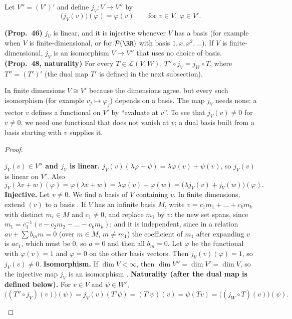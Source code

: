 \documentclass[10pt]{scrartcl}
\newcommand{\PP}{\mathcal P}\newcommand{\LL}{\mathcal L}\newcommand{\MM}{\mathcal M}\newcommand{\T}{\mathsf T}
\begin{document}
\begin{proposition*}
  Let $V''=(V')'$ and define $j_V\colon V\to V''$ by
  \[
    \big(j_V(v)\big)(\varphi) = \varphi(v) \qquad\text{for } v\in V,\ \varphi\in V'.
  \]
  \begin{enumerate}[(a)]
    \ii \textbf{(Prop.~46)} $j_V$ is linear, and it is injective whenever $V$ has a basis (for example when $V$ is finite-dimensional, or for $\PP(\RR)$ with basis $1,x,x^2,\dots$). If $V$ is finite-dimensional, $j_V$ is an isomorphism $V\to V''$ that uses no choice of basis.
    \ii \textbf{(Prop.~48, naturality)} For every $T\in\LL(V,W)$, $T''\circ j_V = j_W\circ T$, where $T''=(T')'$ (the dual map $T'$ is defined in the next subsection).
  \end{enumerate}
\end{proposition*}
\begin{ideabox}
  In finite dimensions $V\cong V'$ because the dimensions agree, but every such isomorphism (for example $v_j\mapsto\varphi_j$) depends on a basis. The map $j_V$ needs none: a vector $v$ defines a functional on $V'$ by ``evaluate at $v$''. To see that $j_V(v)\ne0$ for $v\ne0$, we need one functional that does not vanish at $v$; a dual basis built from a basis starting with $v$ supplies it.
\end{ideabox}
\begin{proof}
  \begin{steps}
    \ii \textbf{$j_V(v)\in V''$ and $j_V$ is linear.} $j_V(v)(\lambda\varphi+\psi)=\lambda\varphi(v)+\psi(v)$, so $j_V(v)$ is linear on $V'$. Also
    \[
      j_V(\lambda v+w)(\varphi)=\varphi(\lambda v+w)=\lambda\varphi(v)+\varphi(w)=\bigl(\lambda j_V(v)+j_V(w)\bigr)(\varphi).
    \]
    \ii \textbf{Injective.} Let $v\ne0$. We find a basis of $V$ containing $v$. In finite dimensions, extend $(v)$ to a basis . If $V$ has an infinite basis $M$, write $v=c_1m_1+\dots+c_km_k$ with distinct $m_i\in M$ and $c_1\ne0$, and replace $m_1$ by $v$: the new set spans, since $m_1=c_1^{-1}(v-c_2m_2-\dots-c_km_k)$; and it is independent, since in a relation $av+\sum b_mm=0$ (over $m\in M$, $m\ne m_1$) the coefficient of $m_1$ after expanding $v$ is $ac_1$, which must be $0$, so $a=0$ and then all $b_m=0$. Let $\varphi$ be the functional with $\varphi(v)=1$ and $\varphi=0$ on the other basis vectors. Then $j_V(v)(\varphi)=1$, so $j_V(v)\ne0$.
    \ii \textbf{Isomorphism.} If $\dim V<\infty$, then $\dim V''=\dim V'=\dim V$, so the injective map $j_V$ is an isomorphism .
    \ii \textbf{Naturality (after the dual map is defined below).} For $v\in V$ and $\psi\in W'$,
    \[
      \big((T''\circ j_V)(v)\big)(\psi)=j_V(v)(T'\psi)=(T'\psi)(v)=\psi(Tv)=\big((j_W\circ T)(v)\big)(\psi).
    \]
  \end{steps}
\end{proof}
\end{document}
